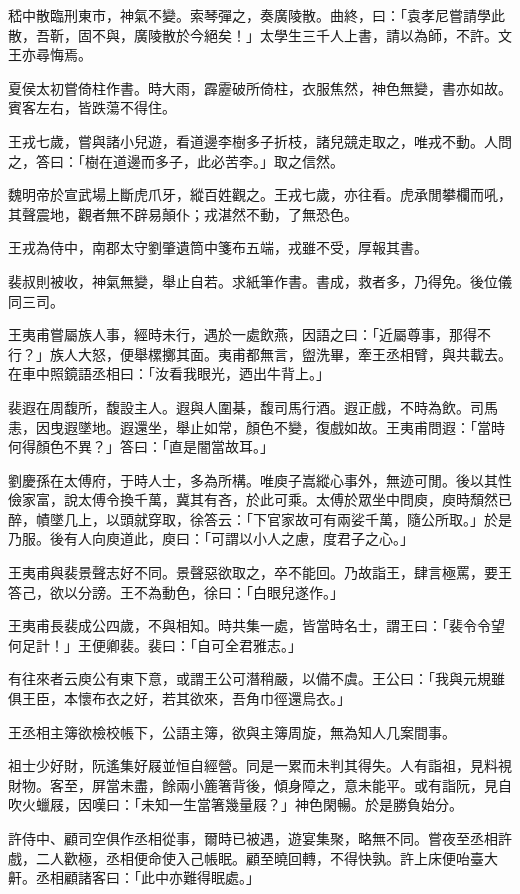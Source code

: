 嵇中散臨刑東市，神氣不變。索琴彈之，奏廣陵散。曲終，曰：「袁孝尼嘗請學此散，吾靳，固不與，廣陵散於今絕矣！」太學生三千人上書，請以為師，不許。文王亦尋悔焉。

夏侯太初嘗倚柱作書。時大雨，霹靂破所倚柱，衣服焦然，神色無變，書亦如故。賓客左右，皆跌蕩不得住。

王戎七歲，嘗與諸小兒遊，看道邊李樹多子折枝，諸兒競走取之，唯戎不動。人問之，答曰：「樹在道邊而多子，此必苦李。」取之信然。

魏明帝於宣武場上斷虎爪牙，縱百姓觀之。王戎七歲，亦往看。虎承閒攀欄而吼，其聲震地，觀者無不辟易顛仆；戎湛然不動，了無恐色。

王戎為侍中，南郡太守劉肇遺筒中箋布五端，戎雖不受，厚報其書。

裴叔則被收，神氣無變，舉止自若。求紙筆作書。書成，救者多，乃得免。後位儀同三司。

王夷甫嘗屬族人事，經時未行，遇於一處飲燕，因語之曰：「近屬尊事，那得不行？」族人大怒，便舉樏擲其面。夷甫都無言，盥洗畢，牽王丞相臂，與共載去。在車中照鏡語丞相曰：「汝看我眼光，迺出牛背上。」

裴遐在周馥所，馥設主人。遐與人圍棊，馥司馬行酒。遐正戲，不時為飲。司馬恚，因曳遐墜地。遐還坐，舉止如常，顏色不變，復戲如故。王夷甫問遐：「當時何得顏色不異？」答曰：「直是闇當故耳。」

劉慶孫在太傅府，于時人士，多為所構。唯庾子嵩縱心事外，無迹可閒。後以其性儉家富，說太傅令換千萬，冀其有吝，於此可乘。太傅於眾坐中問庾，庾時頹然已醉，幘墜几上，以頭就穿取，徐答云：「下官家故可有兩娑千萬，隨公所取。」於是乃服。後有人向庾道此，庾曰：「可謂以小人之慮，度君子之心。」

王夷甫與裴景聲志好不同。景聲惡欲取之，卒不能回。乃故詣王，肆言極罵，要王答己，欲以分謗。王不為動色，徐曰：「白眼兒遂作。」

王夷甫長裴成公四歲，不與相知。時共集一處，皆當時名士，謂王曰：「裴令令望何足計！」王便卿裴。裴曰：「自可全君雅志。」

有往來者云庾公有東下意，或謂王公可潛稍嚴，以備不虞。王公曰：「我與元規雖俱王臣，本懷布衣之好，若其欲來，吾角巾徑還烏衣。」

王丞相主簿欲檢校帳下，公語主簿，欲與主簿周旋，無為知人几案間事。

祖士少好財，阮遙集好屐並恒自經營。同是一累而未判其得失。人有詣祖，見料視財物。客至，屏當未盡，餘兩小簏箸背後，傾身障之，意未能平。或有詣阮，見自吹火蠟屐，因嘆曰：「未知一生當箸幾量屐？」神色閑暢。於是勝負始分。

許侍中、顧司空俱作丞相從事，爾時已被遇，遊宴集聚，略無不同。嘗夜至丞相許戲，二人歡極，丞相便命使入己帳眠。顧至曉回轉，不得快孰。許上床便咍臺大鼾。丞相顧諸客曰：「此中亦難得眠處。」

